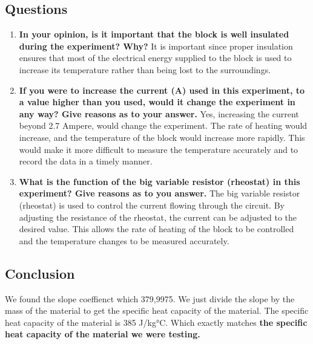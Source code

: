 \documentclass[a4paper]{article}
\begin{document}
    \subsection{Questions}
    \begin{enumerate}
        \item \textbf{In your opinion, is it important that the block is well insulated during the experiment? Why?}
        It is important since proper insulation ensures that most of 
        the electrical energy supplied to the block is used to increase its temperature rather than 
        being lost to the surroundings.
        \item \textbf{If you were to increase the current (A) used in this experiment, to a value higher than you used, would it change the experiment in any way? Give reasons as to your answer.}
        Yes, increasing the current beyond 2.7 Ampere, would change the experiment. The rate of heating would increase, and the temperature of the block would increase more rapidly. This would make it more difficult to measure the temperature accurately and to record the data in a timely manner.
        \item \textbf{What is the function of the big variable resistor (rheostat) in this experiment? Give reasons as to you answer.}
        The big variable resistor (rheostat) is used to control the current flowing through the circuit. By adjusting the resistance of the rheostat, the current can be adjusted to the desired value. This allows the rate of heating of the block to be controlled and the temperature changes to be measured accurately.
    \end{enumerate}

    \subsection{Conclusion}
    We found the slope coeffienct which 379,9975. We just divide the slope by the mass of the material to get the specific heat capacity of the material. The specific heat capacity of the material is 385 J/kg°C. Which exactly matches \textbf{the specific heat capacity of the material we were testing.}
\end{document}
